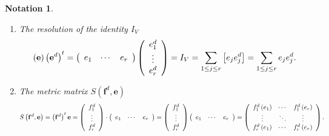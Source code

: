 \documentclass[aps,preprint]{revtex4}%
\newtheorem{notation}[theorem]{Notation}
\begin{document}
\begin{notation}
\begin{enumerate}
\item The resolution of the identity $I_{V}$
\begin{equation}
\left(  \mathbf{e}\right)  \left(  \mathbf{e}^{d}\right)  ^{t}=\left(
\begin{array}
[c]{ccc}%
e_{1} & \cdots & e_{r}%
\end{array}
\right)  \left(
\begin{array}
[c]{c}%
e_{1}^{d}\\
\vdots\\
e_{r}^{d}%
\end{array}
\right)  =I_{V}=\sum_{1\leq j\leq r}\left[  e_{j}e_{j}^{d}\right]
=\sum_{1\leq j\leq r}e_{j}e_{j}^{d}.
\end{equation}


\item The metric matrix $S\left(  \mathbf{f}^{d},\mathbf{e}\right)  $
\begin{equation}
S\left(  \mathbf{f}^{d},\mathbf{e}\right)  =\left(  \mathbf{f}^{d}\right)
^{t}\mathbf{e}=\left(
\begin{array}
[c]{c}%
f_{1}^{d}\\
\vdots\\
f_{r}^{d}%
\end{array}
\right)  \cdot\left(
\begin{array}
[c]{ccc}%
e_{1} & \cdots & e_{r}%
\end{array}
\right)  =\left(
\begin{array}
[c]{c}%
f_{1}^{d}\\
\vdots\\
f_{r}^{d}%
\end{array}
\right)  \left(
\begin{array}
[c]{ccc}%
e_{1} & \cdots & e_{r}%
\end{array}
\right)  =\left(
\begin{array}
[c]{ccc}%
f_{1}^{d}\left(  e_{1}\right)  & \cdots & f_{1}^{d}\left(  e_{r}\right) \\
\vdots & \ddots & \vdots\\
f_{r}^{d}\left(  e_{1}\right)  & \cdots & f_{r}^{d}\left(  e_{r}\right)
\end{array}
\right)  .
\end{equation}



\end{enumerate}
\end{notation}
\end{document}
